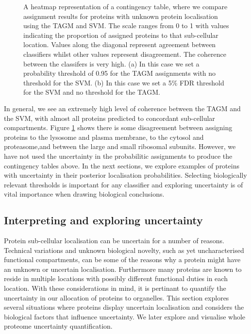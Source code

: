 \documentclass[12pt,english]{article}\usepackage[]{graphicx}\usepackage[]{color}
\newenvironment{knitrout}{}{} %
\begin{document}
\begin{figure}[ht]
\begin{subfigure}[t]{0.5\textwidth}
\begin{knitrout}
\end{knitrout}
\end{subfigure}
  \caption{A heatmap representation of a contingency table,
    where we compare assignment results for proteins
    with unknown protein localisation using the TAGM and
    SVM. The scale ranges from 0 to 1 with values indicating
    the proportion of assigned proteins to that
    sub-cellular location. Values along the diagonal
    represent agreement between classifiers whilst other values
    represent disagreement. The coherence between the classifers is
    very high.
    (a)  In this case we set a probability threshold of 0.95
    for the TAGM assignments with no threshold for the SVM.
    (b)  In this case we set a 5\% FDR threshold for the SVM and
    no threshold for the TAGM.}
\label{figure:contigencytables}
\end{figure}

In general, we see an extremely high level of coherence between the
TAGM and the SVM, with almost all proteins predicted to concordant
sub-cellular compartments. Figure \ref{figure:contigencytables} shows
there is some disagreement between assigning proteins to the lysosome
and plasma membrane, to the cytosol and proteasome,and between the
large and small ribosomal subunits.  However, we have not used the
uncertainty in the probabilitic assignments to produce the contingency
tables above. In the next sections, we explore examples of proteins
with uncertainty in their posterior localisation
probabilities. Selecting biologically relevant thresholds is important
for any classifier and exploring uncertainty is of vital importance
when drawing biological conclusions.


\subsection{Interpreting and exploring uncertainty}

Protein sub-cellular localisation can be uncertain for a number of
reasons. Technical variations and unknown biological novelty, such as
yet uncharacterised functional compartments, can be some of the
reasons why a protein might have an unknown or uncertain
localisation. Furthermore many proteins are known to reside in
multiple locations with possibly different functional duties in each
location. With these considerations in mind, it is pertinant to
quantify the uncertainty in our allocation of proteins to organelles.
This section explores several situations where proteins display
uncertain localisation and considers the biological factors that
influence uncertainty.  We later explore and visualise whole proteome
uncertainty quantification.
\end{document}
